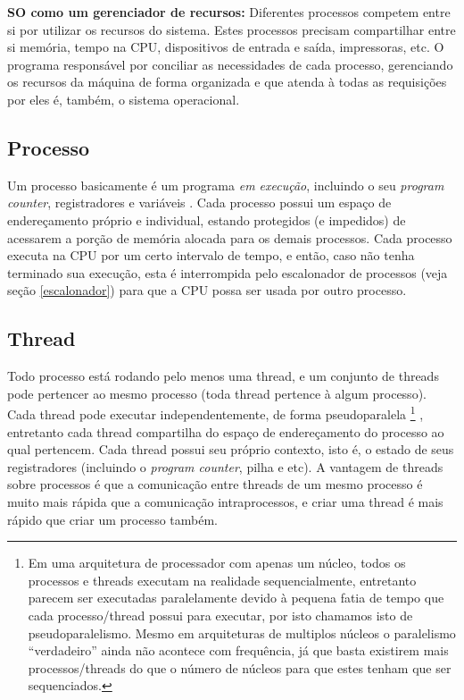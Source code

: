 \textbf{SO como um gerenciador de recursos:}
Diferentes processos competem entre si por utilizar os recursos do sistema. Estes processos precisam compartilhar entre si memória, tempo na CPU, dispositivos de entrada e saída, impressoras, etc. O programa responsável por conciliar as necessidades de cada processo, gerenciando os recursos da máquina de forma organizada e que atenda à todas as requisições por eles é, também, o sistema operacional.

\subsection{Processo}
Um processo basicamente é um programa \emph{em execução}, incluindo o seu \emph{program counter}, registradores e variáveis \cite{tanenbaum}. Cada processo possui um espaço de endereçamento próprio e individual, estando protegidos (e impedidos) de acessarem a porção de memória alocada para os demais processos. Cada processo executa na CPU por um certo intervalo de tempo, e então, caso não tenha terminado sua execução, esta é interrompida pelo escalonador de processos (veja seção \ref{escalonador}) para que a CPU possa ser usada por outro processo.

\subsection{Thread}
Todo processo está rodando pelo menos uma thread, e um conjunto de threads pode pertencer ao mesmo processo (toda thread pertence à algum processo). Cada thread pode executar independentemente, de forma pseudoparalela
\footnote{Em uma arquitetura de processador com apenas um núcleo, todos os processos e threads executam na realidade sequencialmente, entretanto parecem ser executadas paralelamente devido à pequena fatia de tempo que cada processo/thread possui para executar, por isto chamamos isto de pseudoparalelismo. Mesmo em arquiteturas de multiplos núcleos o paralelismo ``verdadeiro'' ainda não acontece com frequência, já que basta existirem mais processos/threads do que o número de núcleos para que estes tenham que ser sequenciados.}
, entretanto cada thread compartilha do espaço de endereçamento do processo ao qual pertencem. Cada thread possui seu próprio contexto, isto é, o estado de seus registradores (incluindo o \emph{program counter}, pilha e etc).
A vantagem de threads sobre processos é que a comunicação entre threads de um mesmo processo é muito mais rápida que a comunicação intraprocessos, e criar uma thread é mais rápido que criar um processo também.

